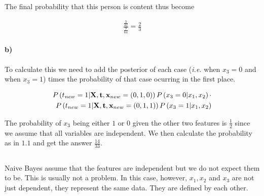 \documentclass{article}
\begin{document}
The final probability that this person is content thus become

\begin{align}
  \frac{\frac{3}{32}}{\frac{9}{64}} = \frac{2}{3}
\end{align}

\paragraph{b)}

To calculate this we need to add the posterior of each case (\emph{i.e.} when
$x_3 = 0$ and when $x_3 = 1$) times the probability of that case ocurring in
the first place.

\begin{align}
  P\left( t_{new} = 1 \vert \mathbf{X}, \mathbf{t}, \mathbf{x}_{new} = (0, 1, 0) \right) P \left( x_3 = 0  \vert x_1, x_2 \right) \cdot \\
  \notag P\left( t_{new} = 1 \vert \mathbf{X}, \mathbf{t}, \mathbf{x}_{new} = (0, 1, 1) \right) P \left( x_3 = 1  \vert x_1, x_2 \right)
\end{align}

The probability of $x_3$ being either $1$ or $0$ given the other two features is
$\frac{1}{2}$ since we assume that all variables are independent. We then calculate the probability as in $1.1$ and get the answer $\frac{14}{33}$.

%
%
%

\subsection{}

Naive Bayes assume that the features are independent but we do not
expect them to be. This is usually not a problem. In this case, however,
$x_1, x_2$ and $x_3$ are not just dependent, they represent the same data.
They are defined by each other.
\end{document}
